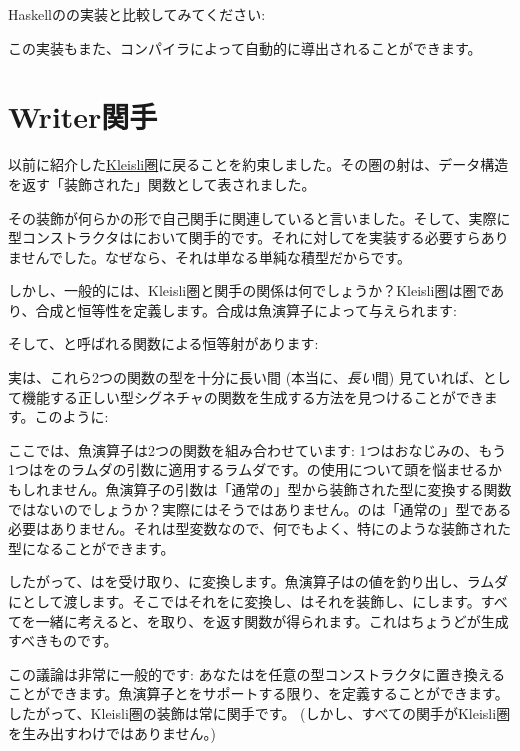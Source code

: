 Haskellのの実装と比較してみてください: 

この実装もまた、コンパイラによって自動的に導出されることができます。

\section{Writer関手}

以前に紹介した\hyperref[kleisli-categories]{Kleisli圏}に戻ることを約束しました。その圏の射は、データ構造を返す「装飾された」関数として表されました。

その装飾が何らかの形で自己関手に関連していると言いました。そして、実際に型コンストラクタはにおいて関手的です。それに対してを実装する必要すらありませんでした。なぜなら、それは単なる単純な積型だからです。

しかし、一般的には、Kleisli圏と関手の関係は何でしょうか？Kleisli圏は圏であり、合成と恒等性を定義します。合成は魚演算子によって与えられます: 

そして、と呼ばれる関数による恒等射があります: 

実は、これら2つの関数の型を十分に長い間 (本当に、\emph{長い}間) 見ていれば、として機能する正しい型シグネチャの関数を生成する方法を見つけることができます。このように: 

ここでは、魚演算子は2つの関数を組み合わせています: 1つはおなじみの、もう1つはをのラムダの引数に適用するラムダです。の使用について頭を悩ませるかもしれません。魚演算子の引数は「通常の」型から装飾された型に変換する関数ではないのでしょうか？実際にはそうではありません。のは「通常の」型である必要はありません。それは型変数なので、何でもよく、特にのような装飾された型になることができます。

したがって、はを受け取り、に変換します。魚演算子はの値を釣り出し、ラムダにとして渡します。そこではそれをに変換し、はそれを装飾し、にします。すべてを一緒に考えると、を取り、を返す関数が得られます。これはちょうどが生成すべきものです。

この議論は非常に一般的です: あなたはを任意の型コンストラクタに置き換えることができます。魚演算子とをサポートする限り、を定義することができます。したがって、Kleisli圏の装飾は常に関手です。 (しかし、すべての関手がKleisli圏を生み出すわけではありません。) 

